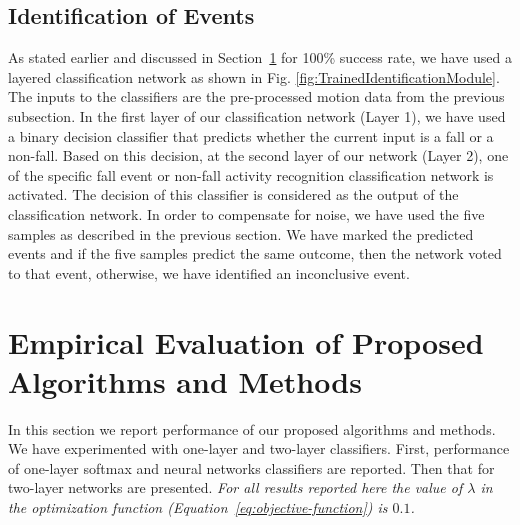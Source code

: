 \documentclass{IEEEtran}
\begin{document}
\subsection{Identification of Events}

As stated earlier and discussed in Section~\ref{Evaluation} for 100\% success rate, we have used a layered classification network as 
shown in Fig. \ref{fig:TrainedIdentificationModule}. The inputs to the classifiers are 
the 
pre-processed motion data from the previous subsection. In the first layer of our 
classification network (Layer 1), we have used a binary decision classifier that predicts 
whether the current input is a fall or a non-fall. Based on this decision, at the second 
layer of our network (Layer 2), one of the specific fall event or non-fall activity 
recognition classification network is activated. The decision of this classifier is 
considered as the output of the classification network. In order to compensate for noise, 
we have used the five samples as described in the previous section. We have marked the 
predicted events and if the five samples predict the same outcome, then the network voted 
to that event, otherwise, we have identified an inconclusive event. 



\section{Empirical Evaluation of Proposed Algorithms and Methods}
\label{Evaluation}

In this section we report performance of our proposed algorithms and methods. 
We have experimented with one-layer and two-layer classifiers.  First, performance of one-layer softmax and neural networks classifiers are reported. Then that for two-layer networks are presented. 
\emph{For all results reported here the value of $\lambda$ in the optimization function 
(Equation~\ref{eq:objective-function}) is $0.1$.}
\end{document}
